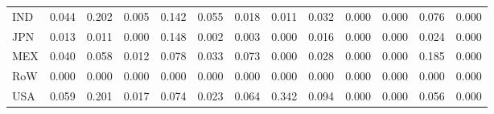 \begin{table}[htbp]
\begin{tabular}{lcccccccccccc}
  IND & \textcolor[RGB]{55,36,200}{0.044} & \textcolor[RGB]{4,3,251}{0.202} & \textcolor[RGB]{123,80,132}{0.005} & \textcolor[RGB]{13,8,242}{0.142} & \textcolor[RGB]{53,34,202}{0.055} & \textcolor[RGB]{83,54,172}{0.018} & \textcolor[RGB]{100,65,155}{0.011} & \textcolor[RGB]{68,44,187}{0.032} & \textcolor[RGB]{255,165,0}{0.000} & \textcolor[RGB]{255,165,0}{0.000} & \textcolor[RGB]{32,21,223}{0.076} & \textcolor[RGB]{255,165,0}{0.000} \\ 
  JPN & \textcolor[RGB]{89,58,166}{0.013} & \textcolor[RGB]{98,63,157}{0.011} & \textcolor[RGB]{255,165,0}{0.000} & \textcolor[RGB]{11,7,244}{0.148} & \textcolor[RGB]{132,85,123}{0.002} & \textcolor[RGB]{130,84,125}{0.003} & \textcolor[RGB]{255,165,0}{0.000} & \textcolor[RGB]{87,56,168}{0.016} & \textcolor[RGB]{255,165,0}{0.000} & \textcolor[RGB]{255,165,0}{0.000} & \textcolor[RGB]{77,50,178}{0.024} & \textcolor[RGB]{255,165,0}{0.000} \\ 
  MEX & \textcolor[RGB]{59,38,196}{0.040} & \textcolor[RGB]{47,30,208}{0.058} & \textcolor[RGB]{94,61,162}{0.012} & \textcolor[RGB]{30,19,225}{0.078} & \textcolor[RGB]{66,43,189}{0.033} & \textcolor[RGB]{38,25,217}{0.073} & \textcolor[RGB]{255,165,0}{0.000} & \textcolor[RGB]{74,48,181}{0.028} & \textcolor[RGB]{255,165,0}{0.000} & \textcolor[RGB]{255,165,0}{0.000} & \textcolor[RGB]{8,5,246}{0.185} & \textcolor[RGB]{255,165,0}{0.000} \\ 
  RoW & \textcolor[RGB]{255,165,0}{0.000} & \textcolor[RGB]{255,165,0}{0.000} & \textcolor[RGB]{255,165,0}{0.000} & \textcolor[RGB]{255,165,0}{0.000} & \textcolor[RGB]{255,165,0}{0.000} & \textcolor[RGB]{255,165,0}{0.000} & \textcolor[RGB]{255,165,0}{0.000} & \textcolor[RGB]{255,165,0}{0.000} & \textcolor[RGB]{255,165,0}{0.000} & \textcolor[RGB]{255,165,0}{0.000} & \textcolor[RGB]{255,165,0}{0.000} & \textcolor[RGB]{255,165,0}{0.000} \\ 
  USA & \textcolor[RGB]{45,29,210}{0.059} & \textcolor[RGB]{6,4,249}{0.201} & \textcolor[RGB]{85,55,170}{0.017} & \textcolor[RGB]{36,23,219}{0.074} & \textcolor[RGB]{79,51,176}{0.023} & \textcolor[RGB]{42,27,212}{0.064} & \textcolor[RGB]{0,0,255}{0.342} & \textcolor[RGB]{23,15,232}{0.094} & \textcolor[RGB]{255,165,0}{0.000} & \textcolor[RGB]{255,165,0}{0.000} & \textcolor[RGB]{49,32,206}{0.056} & \textcolor[RGB]{255,165,0}{0.000} \\ 
   \hline
\end{tabular}
\end{table}

